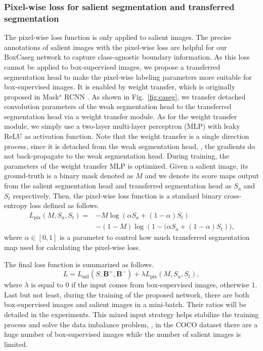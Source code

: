 \documentclass[final]{cvpr}
\begin{document}
\subsubsection{Pixel-wise loss for salient segmentation and transferred segmentation}
\vspace{-2mm}
The pixel-wise loss function is only applied to salient images. The precise annotations of salient images with the pixel-wise loss are helpful for our BoxCaseg network to capture class-agnostic boundary information. As this loss cannot be applied to box-supervised images, we propose a transferred segmentation head to make the pixel-wise labeling parameters more suitable for box-supervised images. It is enabled by weight transfer, which is originally proposed in Mask$^{\star}$ RCNN \cite{hu2018learning}. As shown in Fig.~\ref{fig:caseg}, we transfer detached convolution parameters of the weak segmentation head to the transferred segmentation head via a weight transfer module. As for the weight transfer module, we simply use a two-layer multi-layer perceptron (MLP) with leaky ReLU as activation function. Note that the weight transfer is a single direction process, since it is detached from the weak segmentation head, \ie, the gradients do not back-propagate to the weak segmentation head. During training, the parameters of the weight transfer MLP is optimized. Given a salient image, its ground-truth is a binary mask denoted as $M$ and we denote its score maps output from the salient segmentation head and transferred segmentation head as $S_a$ and $S_t$ respectively. Then, the pixel-wise loss function is a standard binary cross-entropy loss defined as follows.
\begin{equation}\label{eq:pix}
\begin{split}
    L_\text{pix}(M, S_a, S_t) = &
    - M \log \left(  \alpha S_a + (1-\alpha) S_t  \right) \\ &
    - (1-M) \log \left( 1-  (\alpha S_a + (1-\alpha) S_t  \right)) \text{,}
\end{split}
\end{equation}
where $\alpha \in [0,1]$ is a parameter to control how much transferred segmentation map used for calculating the pixel-wise loss.



The final loss function is summarized as follows.
\begin{equation}\label{label}
     L = L_\text{mil}(S, \mathbf{B}^+, \mathbf{B}^-) + \lambda L_\text{pix}(M, S_a, S_t),
\end{equation}
where $\lambda$ is equal to $0$ if the input comes from box-supervised images, otherwise $1$. Last but not least, during the training of the proposed network, there are both box-supervised images and salient images in a mini-batch. Their ratios will be detailed in the experiments. This mixed input strategy helps stabilize the training process and solve the data imbalance problem, \eg, in the COCO dataset there are a huge number of box-supervised images while the number of salient images is limited. 
\end{document}
